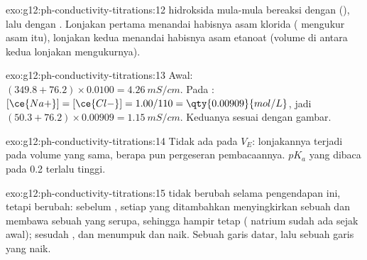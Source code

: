 \begin{solution}{exo:g12:ph-conductivity-titrations:12}
 hidroksida mula-mula bereaksi dengan  (), lalu
dengan . Lonjakan pertama menandai habisnya asam klorida
( mengukur asam itu), lonjakan kedua menandai
habisnya asam etanoat (volume di antara kedua lonjakan mengukurnya).
\end{solution}

\begin{solution}{exo:g12:ph-conductivity-titrations:13}
Awal: $(349.8 + 76.2) \times 0.0100 = \qty{4.26}{mS/cm}$. Pada : $[\ce{Na+}] = [\ce{Cl-}] = 1.00/110 = \qty{0.00909}{mol/L}$,
jadi $(50.3 + 76.2) \times 0.00909 = \qty{1.15}{mS/cm}$. Keduanya
sesuai dengan gambar.
\end{solution}

\begin{solution}{exo:g12:ph-conductivity-titrations:14}
Tidak ada pada $V_E$: lonjakannya terjadi pada volume yang sama, berapa
pun pergeseran pembacaannya. $pK_a$ yang dibaca pada 
0.2 terlalu tinggi.
\end{solution}

\begin{solution}{exo:g12:ph-conductivity-titrations:15}
 tidak berubah selama pengendapan ini, tetapi  berubah:
sebelum , setiap  yang ditambahkan menyingkirkan
sebuah  dan membawa sebuah  yang 
serupa, sehingga  hampir tetap ( natrium sudah
ada sejak awal); sesudah ,  dan 
menumpuk dan  naik. Sebuah garis datar, lalu sebuah
garis yang naik.
\end{solution}

